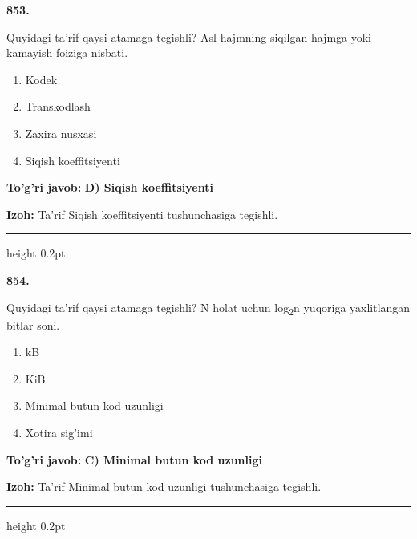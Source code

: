 \documentclass[10pt,a4paper,oneside]{article}
\begin{document}
\noindent\textbf{\color{ink}853.}
\par
Quyidagi ta'rif qaysi atamaga tegishli? Asl hajmning siqilgan hajmga yoki kamayish foiziga nisbati.
\begin{enumerate}[label=\Alph*),leftmargin=9mm]
\item Kodek
\item Transkodlash
\item Zaxira nusxasi
\item Siqish koeffitsiyenti
\end{enumerate}
\begin{tcolorbox}[enhanced,breakable,colback=teal!4,colframe=teal!50!black,boxrule=0.5pt,arc=1.1mm,left=3mm,right=3mm,top=1.7mm,bottom=1.7mm,before skip=2mm,after skip=2mm]
\textbf{\color{teal}To'g'ri javob:} \textbf{D) Siqish koeffitsiyenti}
\par\smallskip
\textbf{Izoh:} Ta'rif Siqish koeffitsiyenti tushunchasiga tegishli.
\end{tcolorbox}
\vspace{2mm}\hrule height 0.2pt \vspace{3mm}

\noindent\textbf{\color{ink}854.}
\par
Quyidagi ta'rif qaysi atamaga tegishli? N holat uchun log\textsubscript{2}n yuqoriga yaxlitlangan bitlar soni.
\begin{enumerate}[label=\Alph*),leftmargin=9mm]
\item kB
\item KiB
\item Minimal butun kod uzunligi
\item Xotira sig'imi
\end{enumerate}
\begin{tcolorbox}[enhanced,breakable,colback=teal!4,colframe=teal!50!black,boxrule=0.5pt,arc=1.1mm,left=3mm,right=3mm,top=1.7mm,bottom=1.7mm,before skip=2mm,after skip=2mm]
\textbf{\color{teal}To'g'ri javob:} \textbf{C) Minimal butun kod uzunligi}
\par\smallskip
\textbf{Izoh:} Ta'rif Minimal butun kod uzunligi tushunchasiga tegishli.
\end{tcolorbox}
\vspace{2mm}\hrule height 0.2pt \vspace{3mm}
\end{document}
